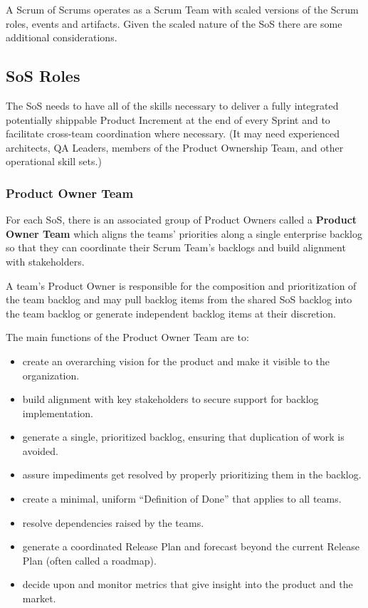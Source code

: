 \documentclass[12pt,a4paper,parskip=full]{scrartcl}
\begin{document}
A Scrum of Scrums operates as a Scrum Team with scaled versions of the Scrum roles, events and artifacts. Given the scaled nature of the SoS there are some additional considerations.

\subsection{SoS Roles}

The SoS needs to have all of the skills necessary to deliver a fully integrated potentially shippable Product Increment at the end of every Sprint and to facilitate cross-team coordination where necessary. (It may need experienced architects, QA Leaders, members of the Product Ownership Team, and other operational skill sets.) 

\subsubsection{Product Owner Team}

For each SoS, there is an associated group of Product Owners called a \textbf{Product Owner Team} which aligns the teams' priorities along a single enterprise backlog so that they can coordinate their Scrum Team's backlogs and build alignment with stakeholders.

A team's Product Owner is responsible for the composition and prioritization of the team backlog and may pull backlog items from the shared SoS backlog into the team backlog or generate independent backlog items at their discretion.

The main functions of the Product Owner Team are to:

\begin{itemize}
	\item create an overarching vision for the product and make it visible to the organization.
	\item build alignment with key stakeholders to secure support for backlog implementation.
	\item generate a single, prioritized backlog, ensuring that duplication of work is avoided.
	\item assure impediments get resolved by properly prioritizing them in the backlog.
	\item create a minimal, uniform ``Definition of Done'' that applies to all teams.
	\item resolve dependencies raised by the teams.
	\item generate a coordinated Release Plan and forecast beyond the current Release Plan (often called a roadmap).
	\item decide upon and monitor metrics that give insight into the product and the market.
\end{itemize}
\end{document}
